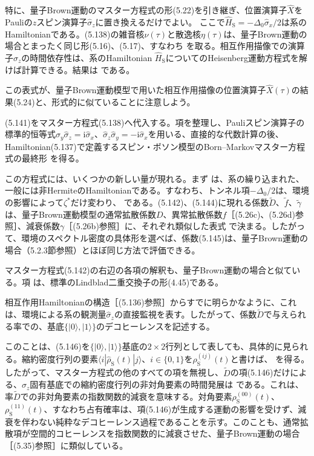 特に、量子Brown運動のマスター方程式の形(5.22)を引き継ぎ、位置演算子$\hat X$をPauliの$z$スピン演算子$\hat\sigma_z$に置き換えるだけでよい。
ここで$\hat H_{\mathrm S}=-\Delta_0\hat\sigma_x/2$は系のHamiltonianである。(5.138)の雑音核$\nu(\tau)$と散逸核$\eta(\tau)$は、量子Brown運動の場合とまったく同じ形(5.16)、(5.17)、すなわち
を取る。相互作用描像での演算子$\hat\sigma_z$の時間依存性は、系のHamiltonian $\hat H_{\mathrm S}$についてのHeisenberg運動方程式を解けば計算できる。結果は
である。

\hypertarget{srcpage:220}{}\label{srcpage:220}
この表式が、量子Brown運動模型で用いた相互作用描像の位置演算子$\hat X(\tau)$の結果(5.24)と、形式的に似ていることに注意しよう。

(5.141)をマスター方程式(5.138)へ代入する。項を整理し、Pauliスピン演算子の標準的恒等式$\hat\sigma_y\hat\sigma_z=\mathrm i\hat\sigma_x$、$\hat\sigma_z\hat\sigma_y=-\mathrm i\hat\sigma_x$を用いる、直接的な代数計算の後、Hamiltonian(5.137)で定義するスピン・ボソン模型のBorn--Markovマスター方程式の最終形
を得る。

この方程式には、いくつかの新しい量が現れる。まず
は、系の繰り込まれた、一般には非HermiteのHamiltonianである。すなわち、トンネル項$-\Delta_0/2$は、環境の影響によって$\zeta^*$だけ変わり、
である。(5.142)、(5.144)に現れる係数$\widetilde D$、$\widetilde f$、$\widetilde\gamma$は、量子Brown運動模型の通常拡散係数$D$、異常拡散係数$f$［(5.26c)、(5.26d)参照］、減衰係数$\gamma$［(5.26b)参照］に、それぞれ類似した表式
で決まる。したがって、環境のスペクトル密度の具体形を選べば、係数(5.145)は、量子Brown運動の場合（5.2.3節参照）とほぼ同じ方法で評価できる。

マスター方程式(5.142)の右辺の各項の解釈も、量子Brown運動の場合と似ている。項
は、標準のLindblad二重交換子の形(4.45)である。

\hypertarget{srcpage:221}{}\label{srcpage:221}
相互作用Hamiltonianの構造［(5.136)参照］からすでに明らかなように、これは、環境による系の観測量$\hat\sigma_z$の直接監視を表す。したがって、係数$\widetilde D$で与えられる率での、基底$\{|0\rangle,|1\rangle\}$のデコヒーレンスを記述する。

このことは、(5.146)を$\{|0\rangle,|1\rangle\}$基底の$2\times2$行列として表しても、具体的に見られる。縮約密度行列の要素$\langle i|\hat\rho_{\mathrm S}(t)|j\rangle$、$i\in\{0,1\}$を$\rho_{\mathrm S}^{(ij)}(t)$と書けば、
を得る。したがって、マスター方程式の他のすべての項を無視し、$\widetilde D$の項(5.146)だけによる、$\hat\sigma_z$固有基底での縮約密度行列の非対角要素の時間発展は
である。これは、率$\widetilde D$での非対角要素の指数関数的減衰を意味する。対角要素$\rho_{\mathrm S}^{(00)}(t)$、$\rho_{\mathrm S}^{(11)}(t)$、すなわち占有確率は、項(5.146)が生成する運動の影響を受けず、減衰を伴わない純粋なデコヒーレンス過程であることを示す。このことも、通常拡散項が空間的コヒーレンスを指数関数的に減衰させた、量子Brown運動の場合［(5.35)参照］に類似している。

